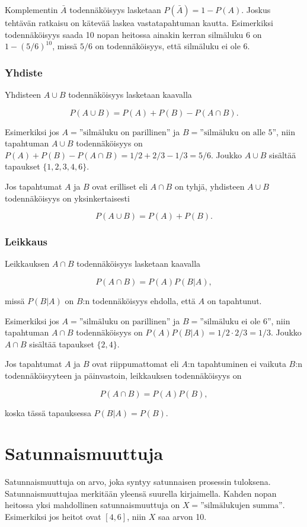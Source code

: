 Komplementin $\bar A$
todennäköisyys lasketaan $P(\bar A)=1-P(A)$.
Joskus tehtävän ratkaisu on kätevää
laskea vastatapahtuman kautta.
Esimerkiksi todennäköisyys saada
10 nopan heitossa ainakin
kerran silmäluku 6 on $1-(5/6)^{10}$,
missä $5/6$ on todennäköisyys, että silmäluku ei ole 6.

\subsubsection*{Yhdiste}

Yhdisteen $A \cup B$ todennäköisyys lasketaan kaavalla 

\[P(A \cup B)=P(A)+P(B)-P(A \cap B).\]

Esimerkiksi jos $A=\textrm{''silmäluku on parillinen''}$
ja $B=\textrm{''silmäluku on alle 5''}$,
niin tapahtuman $A \cup B$ todennäköisyys
on $P(A)+P(B)-P(A \cap B)=1/2+2/3-1/3=5/6$.
Joukko $A \cup B$ sisältää tapaukset $\{1,2,3,4,6\}$.

Jos tapahtumat $A$ ja $B$ ovat erilliset eli $A \cap B$ on tyhjä,
yhdisteen $A \cup B$ todennäköisyys on yksinkertaisesti

\[P(A \cup B)=P(A)+P(B).\]

\subsubsection*{Leikkaus}

Leikkauksen $A \cap B$ todennäköisyys lasketaan kaavalla

\[P(A \cap B)=P(A)P(B|A),\]

missä $P(B|A)$ on $B$:n todennäköisyys
ehdolla, että $A$ on tapahtunut.

Esimerkiksi jos $A=\textrm{''silmäluku on parillinen''}$
ja $B=\textrm{''silmäluku ei ole 6''}$,
niin tapahtuman $A \cap B$ todennäköisyys
on $P(A)P(B|A)=1/2 \cdot 2/3 = 1/3$.
Joukko $A \cap B$ sisältää tapaukset $\{2,4\}$.


Jos tapahtumat $A$ ja $B$ ovat riippumattomat
eli $A$:n tapahtuminen ei vaikuta $B$:n todennäköisyyteen
ja päinvastoin, leikkauksen todennäköisyys on

\[P(A \cap B)=P(A)P(B),\]

koska tässä tapauksessa $P(B|A)=P(B)$.

\section{Satunnaismuuttuja}

Satunnaismuuttuja on arvo, joka syntyy satunnaisen
prosessin tuloksena.
Satunnaismuuttujaa merkitään yleensä
suurella kirjaimella.
Kahden nopan heitossa yksi mahdollinen
satunnaismuuttuja on $X=\textrm{''silmälukujen summa''}$.
Esimerkiksi jos heitot ovat $[4,6]$,
niin $X$ saa arvon 10.

